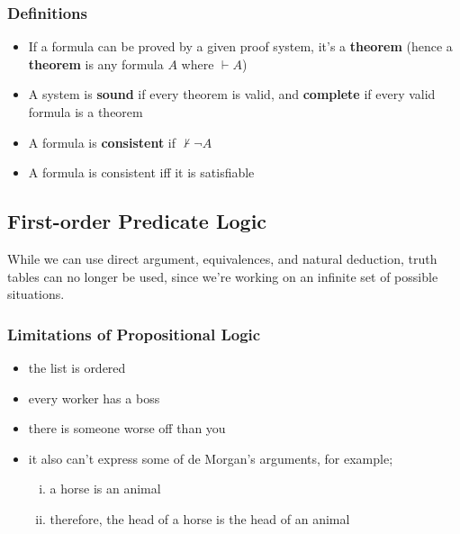 \documentclass[a4paper, 12pt]{article}
\begin{document}
            \subsubsection*{Definitions}
                \begin{itemize}
                    \itemsep0em
                    \item If a formula can be proved by a given proof system, it's a \textbf{theorem} (hence a \textbf{theorem} is any formula $A$ where $\vdash A$)
                    \item A system is \textbf{sound} if every theorem is valid, and \textbf{complete} if every valid formula is a theorem
                    \item A formula is \textbf{consistent} if $\nvdash \neg A$
                    \item A formula is consistent iff it is satisfiable
                \end{itemize}
        \subsection*{First-order Predicate Logic}
            While we can use direct argument, equivalences, and natural deduction, truth tables can no longer be used, since we're working on an infinite set of possible situations.
            \subsubsection*{Limitations of Propositional Logic}
                \begin{itemize}
                    \itemsep0em
                    \item the list is ordered
                    \item every worker has a boss
                    \item there is someone worse off than you
                    \item it also can't express some of de Morgan's arguments, for example;
                        \begin{enumerate}[i.]
                            \item a horse is an animal
                            \item therefore, the head of a horse is the head of an animal
                        \end{enumerate}
                \end{itemize}
\end{document}
